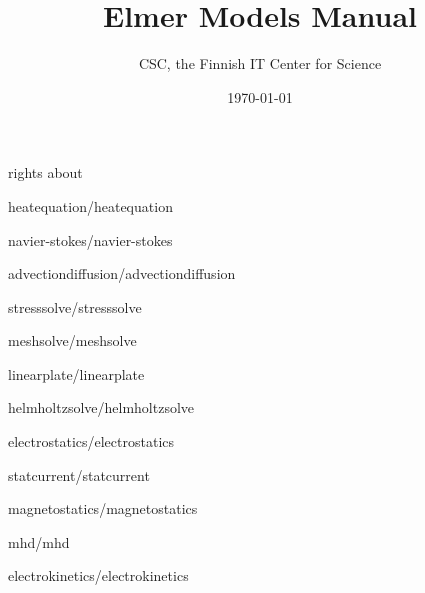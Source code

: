 \documentclass[a4paper,english,10pt]{report}    %
\title{\Huge{\bf Elmer Models Manual}}
\author{CSC, the Finnish IT Center for Science}
\date{\today}
\newcommand{\Include}{}
\begin{document}
\maketitle


\begin{versiona}
\Include{rights}
\Include{about}

\pagestyle{empty}

\setcounter{secnumdepth}{2}
\setcounter{tocdepth}{1}  

\tableofcontents
\end{versiona}



\renewcommand{\chaptername}{Model}
\newpage
\pagestyle{fancy}


\clearpage
{}

\graphicspath{{./}{heatequation/}}
\Include{heatequation/heatequation}

\graphicspath{{./}{navier-stokes/}}
\Include{navier-stokes/navier-stokes}

\graphicspath{{./}{advectiondiffusion/}}
\Include{advectiondiffusion/advectiondiffusion}

\graphicspath{{./}{stresssolve/}}
\Include{stresssolve/stresssolve}

\graphicspath{{./}{meshsolve/}}
\Include{meshsolve/meshsolve}

\graphicspath{{./}{linearplate/}}
\Include{linearplate/linearplate}



\graphicspath{{./}{helmholtzsolve/}}
\Include{helmholtzsolve/helmholtzsolve}

\graphicspath{{./}{electrostatics/}}
\Include{electrostatics/electrostatics}

\graphicspath{{./}{statcurrent/}}
\Include{statcurrent/statcurrent}

\graphicspath{{./}{magnetostatics/}}
\Include{magnetostatics/magnetostatics}

\graphicspath{{./}{mhd/}}
\Include{mhd/mhd}

\graphicspath{{./}{electrokinetics/}}
\Include{electrokinetics/electrokinetics}
\end{document}
